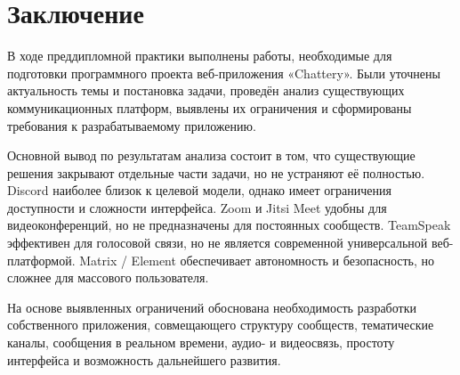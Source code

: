 \documentclass[a4paper,12pt]{extarticle}
\begin{document}
\section{Заключение}

В ходе преддипломной практики выполнены работы, необходимые для подготовки программного проекта веб-приложения «Chattery». Были уточнены актуальность темы и постановка задачи, проведён анализ существующих коммуникационных платформ, выявлены их ограничения и сформированы требования к разрабатываемому приложению.

Основной вывод по результатам анализа состоит в том, что существующие решения закрывают отдельные части задачи, но не устраняют её полностью. Discord наиболее близок к целевой модели, однако имеет ограничения доступности и сложности интерфейса. Zoom и Jitsi Meet удобны для видеоконференций, но не предназначены для постоянных сообществ. TeamSpeak эффективен для голосовой связи, но не является современной универсальной веб-платформой. Matrix / Element обеспечивает автономность и безопасность, но сложнее для массового пользователя.

На основе выявленных ограничений обоснована необходимость разработки собственного приложения, совмещающего структуру сообществ, тематические каналы, сообщения в реальном времени, аудио- и видеосвязь, простоту интерфейса и возможность дальнейшего развития.

\newpage
\printbibliography[heading=bibintoc]

\newpage
\appendix
\end{document}
